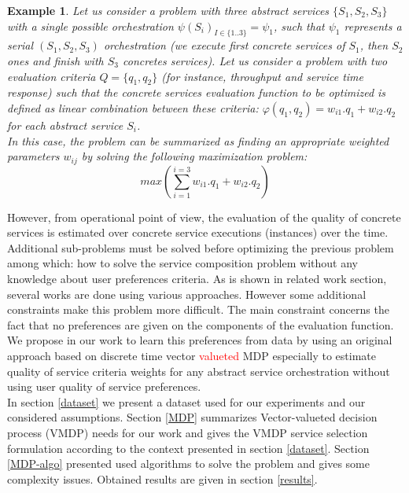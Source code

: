 \documentclass[10pt,journal,compsoc]{IEEEtran}
\newtheorem{example}{Example}
\begin{document}
\begin{example} Let us consider a problem with three abstract services $\{S_1,S_2,S_3\}$ with a single possible orchestration $\psi(S_i)_{I\in\{1..3\}}=\psi_1$, such that $\psi_1$ represents a serial $(S_1,S_2,S_3)$ orchestration (we execute first concrete services of $S_1$, then $S_2$ ones and finish with $S_3$ concretes services). Let us consider a problem with two evaluation criteria $Q=\{q_1,q_2\}$ (for instance, throughput and service time response) such that the concrete services evaluation function to be optimized is defined as linear combination between these criteria: $\varphi(q_1,q_2)= w_{i1}.q_1+w_{i2}.q_2$ for each abstract service $S_i$. \\
In this case, the problem can be summarized as finding an appropriate weighted parameters $w_{ij}$ by solving the following maximization problem:
$$ max(\sum_{i=1}^{i=3} w_{i1}.q_1+w_{i2}.q_2)$$
\end{example}
However, from operational point of view, the evaluation of the quality of concrete services is estimated over concrete service executions (instances) over the time. Additional sub-problems must be solved before optimizing the previous problem among which: how to solve the service composition problem without any knowledge about user preferences criteria. 
As is shown in related work section, several works are done using various approaches. However some additional constraints make this problem more difficult. The main constraint concerns the fact that no preferences are given on the components of the evaluation function. We propose in our work to learn this preferences from data by using an original approach based on discrete time vector \textcolor{red}{valueted} MDP especially to estimate quality of service criteria weights for any abstract service orchestration without using user quality of service preferences.\\
 In section \ref{dataset} we present a dataset used for our experiments and our considered assumptions. Section \ref{MDP} summarizes Vector-valueted decision process (VMDP) needs for our work and gives the VMDP service selection formulation according to the context presented in section \ref{dataset}.  Section \ref{MDP-algo} presented used algorithms to solve the problem and gives some complexity issues. Obtained results are given in section \ref{results}. 
 
\end{document}
